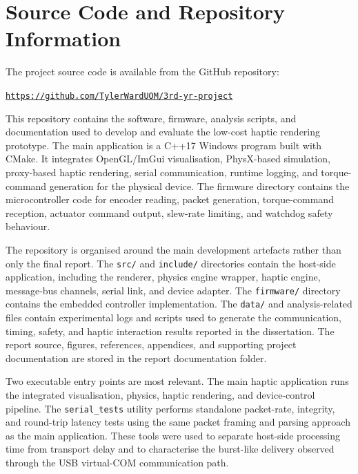 \begin{uomappendix}
\begin{landscape}
{\begin{minipage}{0.95\textheight}
			\label{fig:v2-base-drawing-v1}
		\end{minipage}
	}
	
\end{landscape}

\section{Source Code and Repository Information}
	The project source code is available from the GitHub repository:
	\begin{center}
		\href{https://github.com/TylerWardUOM/3rd-yr-project}{\texttt{https://github.com/TylerWardUOM/3rd-yr-project}}
	\end{center}

	This repository contains the software, firmware, analysis scripts, and documentation used to develop and evaluate the low-cost haptic rendering prototype. The main application is a C++17 Windows program built with CMake. It integrates OpenGL/ImGui visualisation, PhysX-based simulation, proxy-based haptic rendering, serial communication, runtime logging, and torque-command generation for the physical device. The firmware directory contains the microcontroller code for encoder reading, packet generation, torque-command reception, actuator command output, slew-rate limiting, and watchdog safety behaviour.

	The repository is organised around the main development artefacts rather than only the final report. The \texttt{src/} and \texttt{include/} directories contain the host-side application, including the renderer, physics engine wrapper, haptic engine, message-bus channels, serial link, and device adapter. The \texttt{firmware/} directory contains the embedded controller implementation. The \texttt{data/} and analysis-related files contain experimental logs and scripts used to generate the communication, timing, safety, and haptic interaction results reported in the dissertation. The report source, figures, references, appendices, and supporting project documentation are stored in the report documentation folder.

	Two executable entry points are most relevant. The main haptic application runs the integrated visualisation, physics, haptic rendering, and device-control pipeline. The \texttt{serial\_tests} utility performs standalone packet-rate, integrity, and round-trip latency tests using the same packet framing and parsing approach as the main application. These tools were used to separate host-side processing time from transport delay and to characterise the burst-like delivery observed through the USB virtual-COM communication path.


\end{uomappendix}
